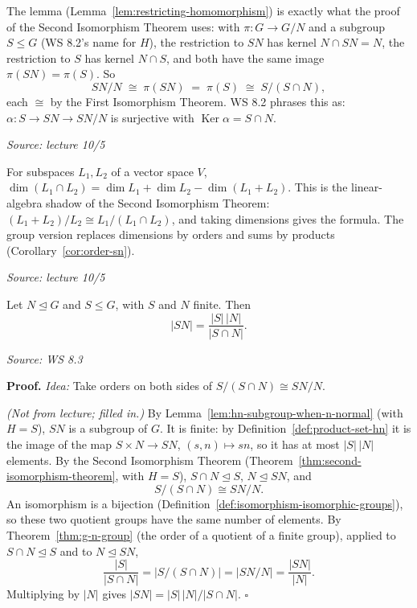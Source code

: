 \documentclass[11pt]{report}
\renewenvironment{proof}[1][Proof]{\noindent\textbf{#1.} }{\hfill$\square$\par\vspace{5pt}}
\newcommand{\srcline}[1]{\par\hfill{\footnotesize\textit{Source: #1}}}
\begin{document}
\begin{rembox}\label{rem:second-iso-revisited}
The lemma (Lemma~\ref{lem:restricting-homomorphism}) is exactly what the proof of the Second Isomorphism Theorem uses: with $\pi: G \to G/N$ and a subgroup $S \leq G$ (WS 8.2's name for $H$), the restriction to $SN$ has kernel $N \cap SN = N$, the restriction to $S$ has kernel $N \cap S$, and both have the same image $\pi(SN) = \pi(S)$. So
\[ SN/N \;\cong\; \pi(SN) \;=\; \pi(S) \;\cong\; S/(S \cap N), \]
each $\cong$ by the First Isomorphism Theorem. WS 8.2 phrases this as: $\alpha: S \to SN \to SN/N$ is surjective with $\operatorname{Ker}\alpha = S \cap N$.
\srcline{lecture 10/5}
\end{rembox}

\begin{rembox}\label{rem:linear-algebra-analogy}
For subspaces $L_1, L_2$ of a vector space $V$, $\dim(L_1 \cap L_2) = \dim L_1 + \dim L_2 - \dim(L_1 + L_2)$. This is the linear-algebra shadow of the Second Isomorphism Theorem: $(L_1 + L_2)/L_2 \cong L_1/(L_1 \cap L_2)$, and taking dimensions gives the formula. The group version replaces dimensions by orders and sums by products (Corollary~\ref{cor:order-sn}).
\srcline{lecture 10/5}
\end{rembox}

\begin{corbox}\label{cor:order-sn}
Let $N \trianglelefteq G$ and $S \leq G$, with $S$ and $N$ finite. Then
\[ |SN| = \frac{|S|\,|N|}{|S \cap N|}. \]
\srcline{WS 8.3}
\end{corbox}

\begin{proof}
\textit{Idea:} Take orders on both sides of $S/(S \cap N) \cong SN/N$.\par
\textit{(Not from lecture; filled in.)} By Lemma~\ref{lem:hn-subgroup-when-n-normal} (with $H = S$), $SN$ is a subgroup of $G$. It is finite: by Definition~\ref{def:product-set-hn} it is the image of the map $S \times N \to SN$, $(s, n) \mapsto sn$, so it has at most $|S|\,|N|$ elements. By the Second Isomorphism Theorem (Theorem~\ref{thm:second-isomorphism-theorem}, with $H = S$), $S \cap N \trianglelefteq S$, $N \trianglelefteq SN$, and
\[ S/(S \cap N) \cong SN/N. \]
An isomorphism is a bijection (Definition~\ref{def:isomorphism-isomorphic-groups}), so these two quotient groups have the same number of elements. By Theorem~\ref{thm:g-n-group} (the order of a quotient of a finite group), applied to $S \cap N \trianglelefteq S$ and to $N \trianglelefteq SN$,
\[ \frac{|S|}{|S \cap N|} = |S/(S \cap N)| = |SN/N| = \frac{|SN|}{|N|}. \]
Multiplying by $|N|$ gives $|SN| = |S|\,|N|/|S \cap N|$.
\end{proof}
\end{document}
